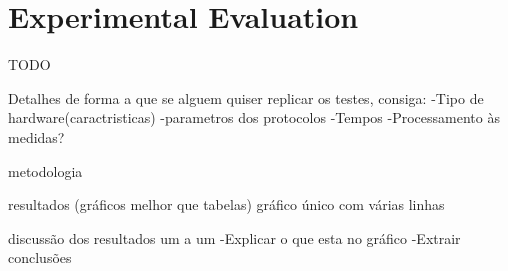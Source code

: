 \section{Experimental Evaluation}
TODO

Detalhes de forma a que se alguem quiser replicar os testes, consiga:
-Tipo de hardware(caractristicas)
-parametros dos protocolos
-Tempos
-Processamento às medidas?

metodologia

resultados (gráficos melhor que tabelas)
gráfico único com várias linhas

discussão dos resultados um a um
-Explicar o que esta no gráfico
-Extrair conclusões